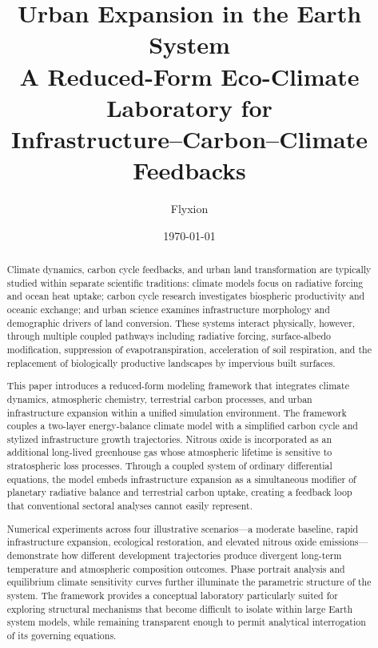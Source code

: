 \documentclass[12pt]{article}
\title{%
  \textbf{Urban Expansion in the Earth System}\\[4pt]
  \large A Reduced-Form Eco-Climate Laboratory for\\
  Infrastructure--Carbon--Climate Feedbacks
}
\author{Flyxion}
\date{\today}
\begin{document}
\maketitle

\begin{abstract}
Climate dynamics, carbon cycle feedbacks, and urban land transformation are
typically studied within separate scientific traditions: climate models focus
on radiative forcing and ocean heat uptake; carbon cycle research investigates
biospheric productivity and oceanic exchange; and urban science examines
infrastructure morphology and demographic drivers of land conversion.  These
systems interact physically, however, through multiple coupled pathways
including radiative forcing, surface-albedo modification, suppression of
evapotranspiration, acceleration of soil respiration, and the replacement of
biologically productive landscapes by impervious built surfaces.

This paper introduces a reduced-form modeling framework that integrates climate
dynamics, atmospheric chemistry, terrestrial carbon processes, and urban
infrastructure expansion within a unified simulation environment.  The framework
couples a two-layer energy-balance climate model with a simplified carbon cycle
and stylized infrastructure growth trajectories.  Nitrous oxide is incorporated
as an additional long-lived greenhouse gas whose atmospheric lifetime is
sensitive to stratospheric loss processes.  Through a coupled system of ordinary
differential equations, the model embeds infrastructure expansion as a
simultaneous modifier of planetary radiative balance and terrestrial carbon
uptake, creating a feedback loop that conventional sectoral analyses cannot
easily represent.

Numerical experiments across four illustrative scenarios---a moderate baseline,
rapid infrastructure expansion, ecological restoration, and elevated nitrous
oxide emissions---demonstrate how different development trajectories produce
divergent long-term temperature and atmospheric composition outcomes.  Phase
portrait analysis and equilibrium climate sensitivity curves further illuminate
the parametric structure of the system.  The framework provides a conceptual
laboratory particularly suited for exploring structural mechanisms that become
difficult to isolate within large Earth system models, while remaining
transparent enough to permit analytical interrogation of its governing
equations.
\end{abstract}
\end{document}
